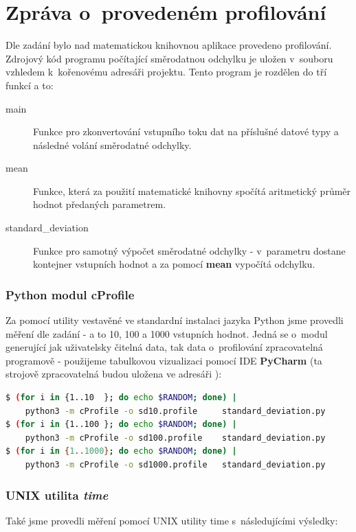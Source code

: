 \documentclass[12pt,a4paper,titlepage]{extarticle}
\begin{document}
\pagestyle{fancy}
\section{Zpráva o~provedeném profilování}
Dle zadání bylo nad matematickou knihovnou aplikace provedeno profilování.
Zdrojový kód programu počítající směrodatnou odchylku je uložen v~souboru 
vzhledem k~kořenovému adresáři projektu. Tento program je rozdělen do tří funkcí a to:
\begin{description}
\item[main] Funkce pro zkonvertování vstupního toku dat na příslušné datové typy a následné volání směrodatné odchylky.
\item[mean] Funkce, která za použití matematické knihovny spočítá aritmetický průměr hodnot předaných parametrem.
\item[standard\_deviation] Funkce pro samotný výpočet směrodatné odchylky - v~parametru dostane kontejner vstupních hodnot
    a za pomocí \textbf{mean} vypočítá odchylku.
\end{description}

\subsubsection{Python modul cProfile}
Za pomocí utility  vestavěné ve standardní instalaci jazyka Python jsme provedli měření dle zadání - a to
 10, 100 a 1000 vstupních hodnot. Jedná se o~modul generující jak uživatelsky čitelná data, tak data o~profilování zpracovatelná
 programově - použijeme tabulkovou vizualizaci pomocí IDE \textbf{PyCharm} (ta strojově zpracovatelná budou uložena ve adresáři ):
\begin{lstlisting}[language=bash]
$ (for i in {1..10  }; do echo $RANDOM; done) |
    python3 -m cProfile -o sd10.profile     standard_deviation.py
$ (for i in {1..100 }; do echo $RANDOM; done) |
    python3 -m cProfile -o sd100.profile    standard_deviation.py
$ (for i in {1..1000}; do echo $RANDOM; done) |
    python3 -m cProfile -o sd1000.profile   standard_deviation.py
\end{lstlisting}

\subsubsection{UNIX utilita \textit{time}}
Také jsme provedli měření pomocí UNIX utility time s~následujícími výsledky:
\end{document}
